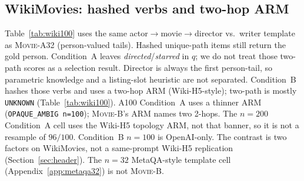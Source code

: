 \documentclass[10pt]{article} %
\begin{document}
\subsection{WikiMovies: hashed verbs and two-hop ARM}
\label{sec:movieb}

Table~\ref{tab:wiki100} uses the same actor$\to$movie$\to$director vs.\
writer template as \textsc{Movie-A32} (person-valued tails).
Hashed unique-path items still return the gold person.
Condition~A leaves \emph{directed}/\emph{starred} in $q$; we do not treat
those two-path scores as a selection result.
Director is always the first person-tail, so parametric knowledge and a
listing-slot heuristic are not separated.
Condition~B hashes those verbs and uses a two-hop ARM (Wiki-H5-style);
two-path is mostly \texttt{UNKNOWN} (Table~\ref{tab:wiki100}).
A100 Condition~A uses a thinner ARM (\texttt{OPAQUE\_AMBIG n=100});
\textsc{Movie-B}'s ARM names two 2-hops.
The $n{=}200$ Condition~A cell uses the Wiki-H5 topology ARM, not that
banner, so it is not a resample of $96/100$.
Condition~B $n{=}100$ is OpenAI-only.
The contrast is two factors on WikiMovies, not a same-prompt Wiki-H5
replication (Section~\ref{sec:header}).
The $n{=}32$ MetaQA-style template cell (Appendix~\ref{app:metaqa32}) is
not \textsc{Movie-B}.
\end{document}
